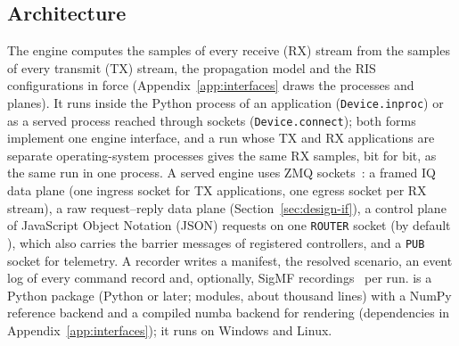 \subsection{Architecture}\label{sec:design-arch}
The engine computes the samples of every receive (RX) stream from the samples of
every transmit (TX) stream, the propagation model and the RIS configurations in force
(Appendix~\ref{app:interfaces} draws the processes and planes). It runs
inside the Python process of an application (\texttt{Device.inproc}) or as a served process
reached through sockets (\texttt{Device.connect}); both forms implement one engine interface,
and a run whose TX and RX applications are separate operating-system processes gives the
same RX samples, bit for bit, as the same run in one process.
A served engine uses ZMQ sockets~\cite{ZeroMQ}: a framed IQ data plane (one
ingress socket for TX applications, one egress socket per RX stream), a raw request--reply data
plane (Section~\ref{sec:design-if}), a control plane of JavaScript Object Notation (JSON)
requests on one \texttt{ROUTER} socket (by default \texttt{\txtControlEndpoint}), which also
carries the barrier messages of registered controllers, and a \texttt{PUB} socket for
telemetry. A recorder writes a manifest, the resolved scenario, an event
log of every command record and, optionally, SigMF recordings~\cite{SigMF} per run.
\sremu{} is a Python package (Python \txtPythonReq{} or later; \numSrcModules{}
modules, about \numSrcKloc{} thousand lines) with a NumPy reference backend and a compiled
numba backend for rendering (dependencies in Appendix~\ref{app:interfaces}); it runs on Windows
and Linux.

